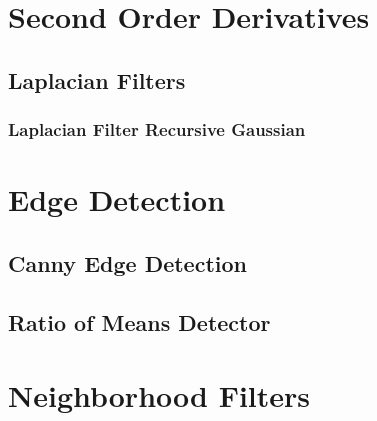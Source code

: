 \ifitkFullVersion

\fi


\section{Second Order Derivatives}
\label{sec:SecondOrderDerivatives}





\subsection{Laplacian Filters}
\label{sec:LaplacianFilters}

\subsubsection{Laplacian Filter Recursive Gaussian}
\ifitkFullVersion


\fi




\section{Edge Detection}

\subsection{Canny Edge Detection}
\ifitkFullVersion

\fi

\subsection{Ratio of Means Detector }





\section{Neighborhood Filters}
\label{sec:NeighborhoodFilters}

